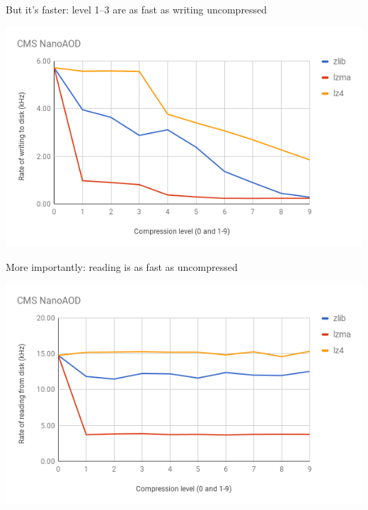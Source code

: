 \documentclass[aspectratio=169]{beamer}
\begin{document}
\begin{frame}{But it's faster: level 1--3 are as fast as writing uncompressed}
\vspace{0.1 cm}
\begin{center}
\includegraphics[width=0.9\linewidth]{write-vs-compression.png}
\end{center}
\end{frame}

\begin{frame}{More importantly: reading is as fast as uncompressed}
\vspace{0.1 cm}
\begin{center}
\includegraphics[width=0.9\linewidth]{read-vs-compression.png}
\end{center}
\end{frame}
\end{document}
